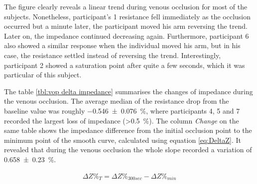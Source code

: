 The figure clearly reveals a linear trend during venous occlusion for most of the subjects. Nonetheless, participant's 1 resistance fell immediately as the occlusion occurred but a minute later, the participant moved his arm reversing the trend. Later on, the impedance continued decreasing again. Furthermore,  participant 6 also showed a similar response when the individual moved his arm, but in his case, the resistance settled instead of reversing the trend. Interestingly, participant 2 showed a saturation point after quite a few seconds, which it was particular of this subject. 

The table \ref{tbl:vop delta impedance} summarises the changes of impedance during the venous occlusion. The average median of the resistance drop from the baseline value was roughly \SI{-0.546(0076)}{\%}, where participants 4, 5 and 7 recorded the largest loss of impedance (>\SI{0.5}{\%}). The column \textit{Change} on the same table shows the impedance difference from the initial occlusion point to the minimum point of the smooth curve, calculated using equation \ref{eq:DeltaZ}. It revealed that during the venous occlusion the whole slope recorded a variation of \SI{0.658(0230)}{\percent}.

\begin{align}
	\label{eq:DeltaZ}
	\Delta Z\%_T = \Delta Z\%_{300 sec} - \Delta Z\%_{min}
\end{align}

